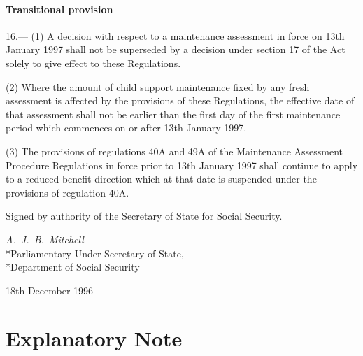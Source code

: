 \documentclass[12pt,a4paper]{article}
\begin{document}
\subsection[16. Transitional provision]{Transitional provision}

16.—%
%
(1) A decision with respect to a maintenance assessment in force on 13th January 1997 shall not be superseded by a decision under section 17 of the Act solely to give effect to these Regulations.

(2) Where the amount of child support maintenance fixed by any fresh assessment 
is affected by the provisions of these Regulations, the effective date of that assessment shall not be earlier than the first day of the first maintenance period which commences on or after 13th January 1997.

(3) The provisions of regulations 40A and 49A of the Maintenance Assessment Procedure Regulations in force prior to 13th January 1997 shall continue to apply to a reduced benefit direction which at that date is suspended under the provisions of regulation 40A.


\bigskip

Signed by authority of the Secretary of State for Social Security.

{\raggedleft
\emph{A.\ J.\ B.\ Mitchell}\\*Parliamentary Under-Secretary of
State,\\*Department of Social Security

}

18th December 1996

\small

\part{Explanatory Note}

\renewcommand\parthead{--- Explanatory Note}
\end{document}
